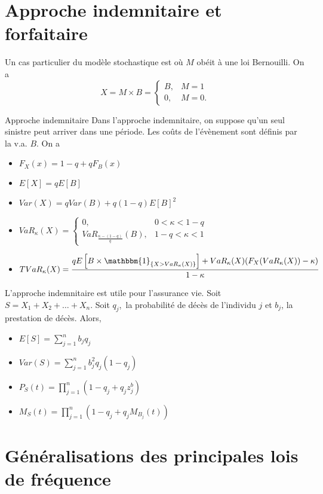 \section{Approche indemnitaire et forfaitaire}

Un cas particulier du modèle stochastique est où $M$ obéit à une loi Bernouilli. On a 
$$X = M \times B = \begin{cases}
B, & M = 1\\
0, & M = 0.
\end{cases}$$

\begin{definition}{Approche indemnitaire}{}
	Dans l'approche indemnitaire, on suppose qu'un seul sinistre peut arriver dans une période. Les coûts de l'évènement sont définis par la v.a. $B$. On a 
	
	\begin{itemize}
		\item $\displaystyle F_X(x) = 1-q + qF_B(x)$
		\item $\displaystyle E[X] = qE[B]$
		\item $\displaystyle Var(X) = qVar(B) + q(1-q)E[B]^2$
		\item $\displaystyle VaR_\kappa(X) = \begin{cases}
		0, & 0<\kappa<1-q\\
		VaR_{\frac{\kappa - (1-q)}{q}}(B), & 1-q<\kappa<1
		\end{cases}$
		\item $\displaystyle TVaR_\kappa(X) = \frac{qE\left[B\times \mathbbm{1}_{\{X > VaR_\kappa(X)\}}\right] + VaR_\kappa(X)(F_X(VaR_\kappa(X)) - \kappa)}{1 - \kappa}$
	\end{itemize}
\end{definition}

L'approche indemnitaire est utile pour l'assurance vie. Soit $S = X_1 + X_2 + \dots + X_n$. Soit $q_j$, la probabilité de décès de l'individu $j$ et $b_j$, la prestation de décès. Alors, 
\begin{itemize}
	\item $\displaystyle E[S] = \sum_{j = 1}^{n}b_j q_j$
	\item $\displaystyle Var(S) = \sum_{j = 1}^{n}b_j^2 q_j(1-q_j)$
	\item $\displaystyle P_S(t) = \prod_{j = 1}^{n}(1 - q_j + q_j z ^ b_j)$
	\item $\displaystyle M_S(t) = \prod_{j = 1}^{n}(1 - q_j + q_j M_{B_j}(t))$
\end{itemize}

\section{Généralisations des principales lois de fréquence}


